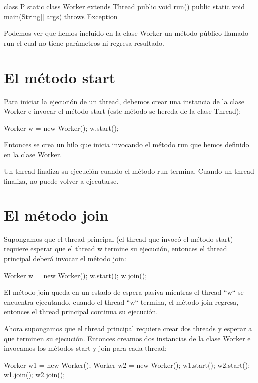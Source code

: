 \documentclass[11pt,a4paper,oneside]{book}
\begin{document}
\begin{SourceCode}
class P
{
  static class Worker extends Thread
  {
    public void run()
    {
    }
  }
  public static void main(String[] args) throws Exception
  {
  }
}
\end{SourceCode}

Podemos ver que hemos incluido en la clase Worker un método público llamado run el cual no tiene parámetros ni regresa resultado.

\section{El método start}

Para iniciar la ejecución de un thread, debemos crear una instancia de la clase Worker e invocar el método start (este método se hereda de la clase Thread):

\begin{SourceCode}
Worker w = new Worker();
w.start();
\end{SourceCode}

Entonces se crea un hilo que inicia invocando el método run que hemos definido en la clase Worker.

Un thread finaliza su ejecución cuando el método run termina. Cuando un thread finaliza, no puede volver a ejecutarse.

\section{El método join}

Supongamos que el thread principal (el thread que invocó el método start) requiere esperar que el thread w termine su ejecución, entonces el thread principal deberá invocar el método join:

\begin{SourceCode}
Worker w = new Worker();
w.start();
w.join();
\end{SourceCode}

El método join queda en un estado de espera pasiva mientras el thread ``w`` se encuentra ejecutando, cuando el thread ``w`` termina, el método join regresa, entonces el thread principal continua su ejecución.

Ahora supongamos que el thread principal requiere crear dos threads y esperar a que terminen su ejecución. Entonces creamos dos instancias de la clase Worker e invocamos los métodos start y join para cada thread:

\begin{SourceCode}
Worker w1 = new Worker();
Worker w2 = new Worker();
w1.start();
w2.start();
w1.join();
w2.join();
\end{SourceCode}
\end{document}
